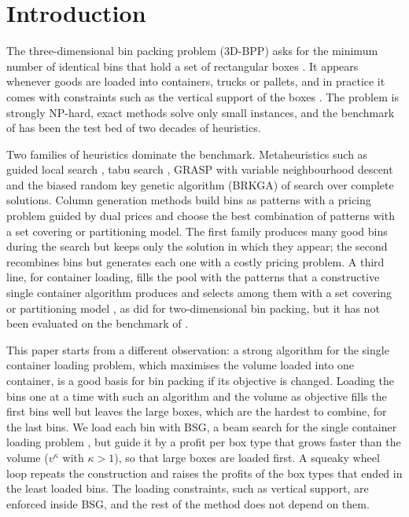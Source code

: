 \section{Introduction}
\label{sec:intro}

The three-dimensional bin packing problem (3D-BPP) asks for the minimum number of identical bins that
hold a set of rectangular boxes \citep{Martello2000}. It appears whenever goods are loaded into
containers, trucks or pallets, and in practice it comes with constraints such as the vertical support
of the boxes \citep{Bortfeldt2013}. The problem is strongly NP-hard, exact methods solve only small
instances, and the benchmark of \citet{Martello2000} has been the test bed of two decades of
heuristics.

Two families of heuristics dominate the benchmark. Metaheuristics such as guided local search
\citep{Faroe2003}, tabu search \citep{Crainic2009}, GRASP with variable neighbourhood descent
\citep{Parreno2010} and the biased random key genetic algorithm (BRKGA) of \citet{Goncalves2013} search
over complete solutions. Column generation methods \citep{Mahvash2018,Elhedhli2019} build bins as
patterns with a pricing problem guided by dual prices and choose the best combination of patterns with
a set covering or partitioning model. The first family produces many good bins during the search but
keeps only the solution in which they appear; the second recombines bins but generates each one with
a costly pricing problem. A third line, for container loading, fills the pool with the patterns that a
constructive single container algorithm produces and selects among them with a set covering or partitioning model
\citep{Eley2003,Che2011}, as \citet{Monaci2006} did for two-dimensional bin packing, but it has not been evaluated on the
benchmark of \citet{Martello2000}.

This paper starts from a different observation: a strong algorithm for the single container loading
problem, which maximises the volume loaded into one container, is a good basis for bin packing if its
objective is changed. Loading the bins one at a time with such an algorithm and the volume as objective
fills the first bins well but leaves the large boxes, which are the hardest to combine, for the last bins.
We load each bin with BSG, a beam search for the single container loading problem
\citep{Araya2014,Araya2017}, but guide it by a profit per box type that grows faster than the volume
($v^\kappa$ with $\kappa>1$), so that large boxes are loaded first. A squeaky wheel loop
\citep{Joslin1999} repeats the construction and raises the profits of the box types that ended in the least
loaded bins. The loading constraints, such as vertical support, are enforced inside BSG, and the rest of
the method does not depend on them.

